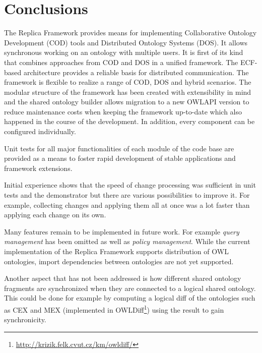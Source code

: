 \chapter{Conclusions}


The Replica Framework provides  means for implementing Collaborative
Ontology Development (COD) tools and Distributed Ontology Systems (DOS).
It  allows synchronous working on an ontology with
multiple users. 
It is first of its kind that combines approaches from COD and DOS in a unified framework.
The ECF-based architecture provides a reliable basis for distributed communication.
The framework is flexible to realize a range of COD, DOS and hybrid scenarios. The modular
structure of the framework has been created with extensibility in mind
and the shared ontology builder allows migration to a new OWLAPI version
to reduce maintenance costs when keeping the framework up-to-date
which also happened in the course of the development. In addition, every component can be configured individually.

Unit tests for all major functionalities of each module of the code
base are provided as a means to foster rapid development of stable applications and framework extensions.

Initial experience shows that the speed of change processing was sufficient in unit tests and the
demonstrator but there are various possibilities to improve it.
For example, collecting changes and applying them all at once was 
a lot faster than applying each change on its own.


Many features remain to be implemented in future work. For example
\emph{query management} has been omitted as well as \emph{policy management}.
While the current implementation of the Replica Framework supports distribution
of OWL ontologies, import dependencies between ontologies are not yet supported.


Another aspect that has not been addressed is how different shared ontology
fragments are synchronized when they are connected to a logical
shared ontology. This could be done for example by computing a logical
diff of the ontologies such as CEX and MEX   \cite{konev2008} (implemented in OWLDiff\footnote{\url{http://krizik.felk.cvut.cz/km/owldiff/}}) using the result to gain synchronicity.

